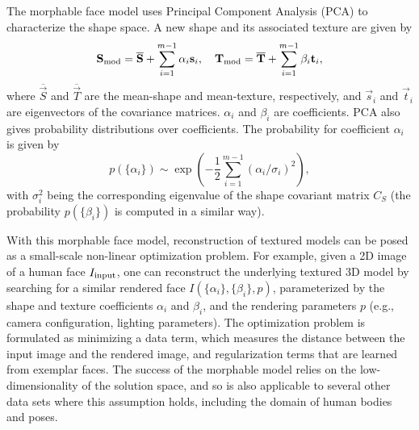 %
The morphable face model uses Principal Component Analysis (PCA) to characterize the shape space. A new shape and its associated texture are given by
$$
\vec{S}_{\textup{mod}} = \overline{\vec{S}} + \sum\limits_{i=1}^{m-1}\alpha_i \vec{s}_i, \quad \vec{T}_{\textup{mod}} = \overline{\vec{T}} + \sum\limits_{i=1}^{m-1}\beta_i \vec{t}_i,
$$
where $\overline{\vec{S}}$ and $\overline{\vec{T}}$ are the mean-shape and mean-texture, respectively, and $\vec{s}_i$ and $\vec{t}_i$ are eigenvectors of the covariance matrices. $\alpha_i$ and $\beta_i$ are coefficients. PCA also gives probability distributions over coefficients. The probability for coefficient $\alpha_i$ is given by
$$
p(\{\alpha_i\}) \sim \exp\left(-\frac{1}{2}\sum\limits_{i=1}^{m-1}(\alpha_i/\sigma_i)^2\right),
$$
with $\sigma_i^2$ being the corresponding eigenvalue of the shape covariant matrix $C_{S}$ (the probability $p(\{\beta_i\})$ is computed in a similar way).

With this morphable face model, reconstruction of textured models can be posed as a small-scale non-linear optimization problem. For example, given a 2D image of a human face $I_{\textup{input}}$, one can reconstruct the underlying textured 3D model by searching for a similar rendered face $I(\{\alpha_i\},\{\beta_i\}, p)$, parameterized by the shape and texture coefficients $\alpha_i$ and $\beta_i$, and the rendering parameters $p$ (e.g., camera configuration, lighting parameters). The optimization problem is formulated as minimizing a data term, which measures the distance between the input image and the rendered image, and regularization terms that are learned from exemplar faces. The success of the morphable model relies on the low-dimensionality of the solution space, and so is also applicable to several other data sets where this assumption holds, including the domain of human bodies and poses.

